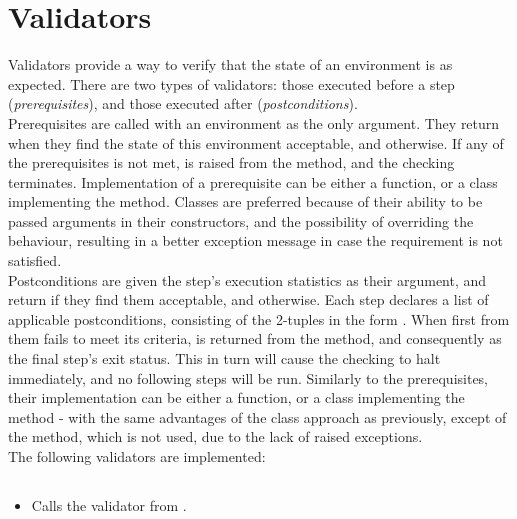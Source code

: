 \section{Validators}\label{sec:validators}

    Validators provide a way to verify that the state of an environment is as expected.
    There are two types of validators: those executed before a step (\textit{prerequisites}), and those executed after
    (\textit{postconditions}). \\

     \label{sec:prerequisites_desc} Prerequisites are called with an environment as the only argument.
    They return  when they find the state of this environment acceptable, and  otherwise.
    If any of the prerequisites is not met,  is raised from the
     method, and the checking terminates.
    Implementation of a prerequisite can be either a function, or a class implementing the  method.
    Classes are preferred because of their ability to be passed arguments in their constructors, and the possibility of
    overriding the  behaviour, resulting in a better exception message in case the requirement is not
    satisfied.\\

     \label{sec:postconditions_desc} Postconditions are given the step's execution statistics as their
    argument, and return  if they find them acceptable, and  otherwise.
    Each step declares a list of applicable postconditions, consisting of the 2-tuples in the form
    .
    When first from them fails to meet its criteria,  is returned from the
     method, and consequently as the final step's
    exit status.
    This in turn will cause the checking to halt immediately, and no following steps will be run.
    Similarly to the prerequisites, their implementation can be either a function, or a class implementing the
     method - with the same advantages of the class approach as previously, except of the
     method, which is not used, due to the lack of raised exceptions.\\

    The following validators are implemented:

\subsection*{}\label{subsec:FileExistsPrerequisite}
\begin{itemize}[label={}]
    \item Calls the  validator from
          \hyperref[sec:Validators]{}.
\end{itemize}

